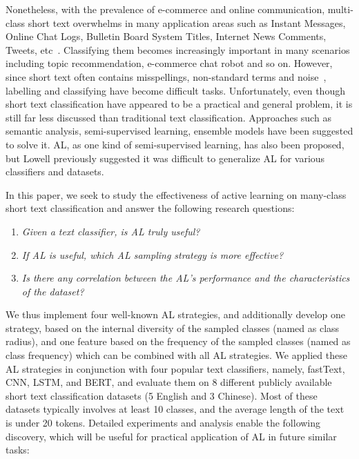 Nonetheless, with the prevalence of e-commerce and online communication, multi-class short text overwhelms in many application areas such as Instant Messages, Online Chat Logs, Bulletin Board System Titles, Internet News Comments, Tweets, etc~\cite{song2014short}. Classifying them becomes increasingly important in many scenarios including
topic recommendation, e-commerce chat robot and so on. However, since short text often contains misspellings, non-standard terms and noise~\cite{yan2009dynamic}, labelling and classifying have become difficult tasks. 
Unfortunately, even though short text classification have appeared to be a practical and general problem, it is still far less discussed than traditional text classification. Approaches such as semantic analysis, semi-supervised learning, ensemble models have been suggested to solve it. AL, as one kind of 
semi-supervised learning, has also been proposed, 
but Lowell\cite{lowell2019practical} previously suggested it was difficult to 
generalize AL for various classifiers and datasets.

In this paper, we seek to study the effectiveness of active learning on many-class short text classification and answer the following
research questions:

\begin{enumerate}[label=(\alph*)]
\item \textit{Given a text classifier, is AL truly useful?}
\item \textit{If AL is useful, which AL sampling strategy is more effective?}
\item \textit{Is there any correlation between the AL's performance and the
characteristics of the dataset?}
\end{enumerate}

We thus implement four well-known AL strategies, and additionally develop one strategy, based on the internal diversity of the sampled classes
(named as class radius), and one feature based on the frequency of
the sampled classes (named as class frequency) which can be combined with all AL strategies. 
We applied these AL strategies in conjunction with
four popular text classifiers, namely, fastText, CNN, 
LSTM, and BERT, and evaluate them on 8 different publicly
available short text classification datasets (5 English and 3 Chinese). 
Most of these datasets typically involves at least 10 classes, 
and the average length of the text is under 20 tokens. Detailed experiments
and analysis enable the following discovery, which will be useful for
practical application of AL in future similar tasks:

